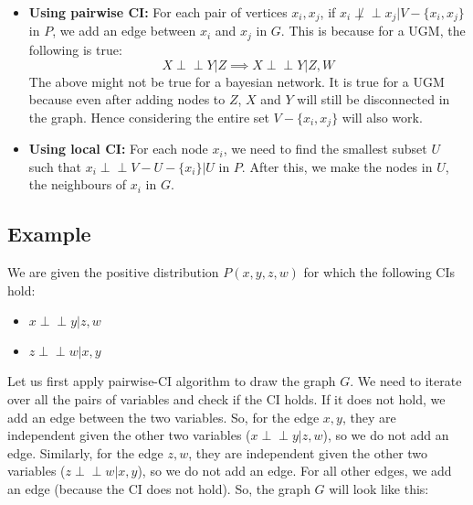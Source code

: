 \documentclass[a4paper,12pt]{article}
\begin{document}
\begin{itemize}
    \item {\bf Using pairwise CI:} For each pair of vertices $x_i, x_j $, if $x_i \not\perp\!\!\!\perp x_j | V - \{x_i, x_j\}$ in $P$, we add an edge between $x_i$ and $x_j$ in $G$. This is because for a UGM, the following is true:
    \[X \perp\!\!\!\perp Y | Z \implies X \perp\!\!\!\perp Y | Z, W\]
    The above might not be true for a bayesian network. It is true for a UGM because even after adding nodes to $Z$, $X$ and $Y$ will still be disconnected in the graph. Hence considering the entire set $V - \{x_i, x_j\}$ will also work.
    \item {\bf Using local CI:} For each node $x_i$, we need to find the smallest subset $U$ such that $x_i \perp\!\!\!\perp V - U - \{x_i\} | U$ in $P$. After this, we make the nodes in $U$, the neighbours of $x_i$ in $G$. 
\end{itemize}


\subsection{Example}
We are given the positive distribution $P(x, y, z, w)$ for which the following CIs hold:
\begin{itemize}
    \item $x \perp\!\!\!\perp y | z, w$
    \item $z \perp\!\!\!\perp w | x, y$
\end{itemize}


Let us first apply pairwise-CI algorithm to draw the graph $G$. We need to iterate over all the pairs of variables and check if the CI holds. If it does not hold, we add an edge between the two variables. So, for the edge $x, y$, they are independent given the other two variables ($x \perp\!\!\!\perp y | z, w$), so we do not add an edge. Similarly, for the edge $z, w$, they are independent given the other two variables ($z \perp\!\!\!\perp w | x, y$), so we do not add an edge. For all other edges, we add an edge (because the CI does not hold). So, the graph $G$ will look like this:

\begin{center}
\end{center}
\end{document}
